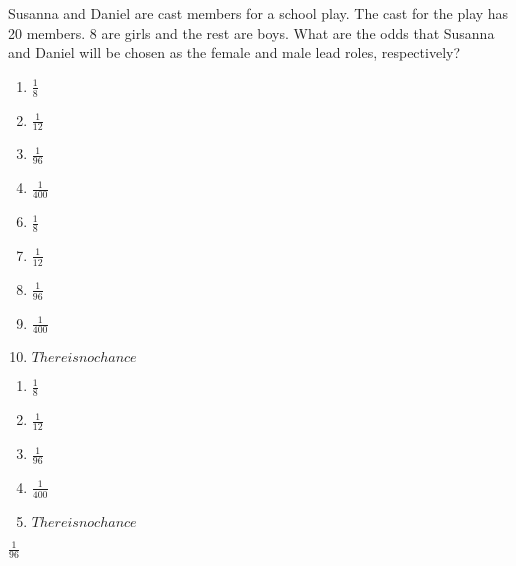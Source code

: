 Susanna and Daniel are cast members for a school play. The cast for the play has 20 members. 8 are girls and the rest are boys. What are the odds that Susanna and Daniel will be chosen as the female and male lead roles, respectively?

\ifsat
	\begin{enumerate}[label=\Alph*)]
		\item   $\frac{1}{8}$
		\item  $\frac{1}{12}$ 
		\item  $\frac{1}{96}$ %
		\item  $\frac{1}{400}$ 
	\end{enumerate}
\else
\fi

\ifacteven
	\begin{enumerate}[label=\textbf{\Alph*.},itemsep=\fill,align=left]
		\setcounter{enumii}{5}
		\item   $\frac{1}{8}$
		\item  $\frac{1}{12}$ 
		\item  $\frac{1}{96}$ %
		\addtocounter{enumii}{1}
		\item  $\frac{1}{400}$ 
		\item  $There is no chance$ 
	\end{enumerate}
\else
\fi

\ifactodd
	\begin{enumerate}[label=\textbf{\Alph*.},itemsep=\fill,align=left]
		\item   $\frac{1}{8}$
		\item  $\frac{1}{12}$ 
		\item  $\frac{1}{96}$ %
		\item  $\frac{1}{400}$ 
		\item  $There is no chance$ 
	\end{enumerate}
\else
\fi

\ifgridin
  $\frac{1}{96}$ %
		
\else
\fi

